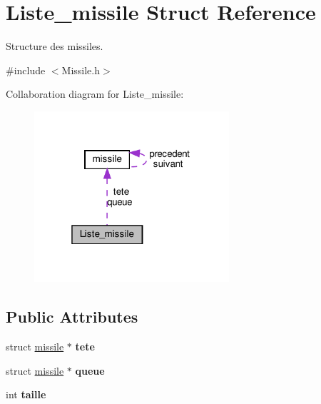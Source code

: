 \hypertarget{struct_liste__missile}{}\section{Liste\+\_\+missile Struct Reference}
\label{struct_liste__missile}


Structure des missiles.  




{\ttfamily \#include $<$Missile.\+h$>$}



Collaboration diagram for Liste\+\_\+missile\+:
\nopagebreak
\begin{figure}[H]
\begin{center}
\leavevmode
\includegraphics[width=205pt]{struct_liste__missile__coll__graph}
\end{center}
\end{figure}
\subsection*{Public Attributes}
\begin{DoxyCompactItemize}
\item 
\mbox{\label{struct_liste__missile_a3c62c31d9b67a54a5d44c46fc8a3ba86}} 
struct \hyperlink{structmissile}{missile} $\ast$ {\bfseries tete}
\item 
\mbox{\label{struct_liste__missile_aa96ce12992c12f603bb4d03d4d8dd627}} 
struct \hyperlink{structmissile}{missile} $\ast$ {\bfseries queue}
\item 
\mbox{\label{struct_liste__missile_ae4f3272f8c540fa9de9c0445677a005a}} 
int {\bfseries taille}
\end{DoxyCompactItemize}


